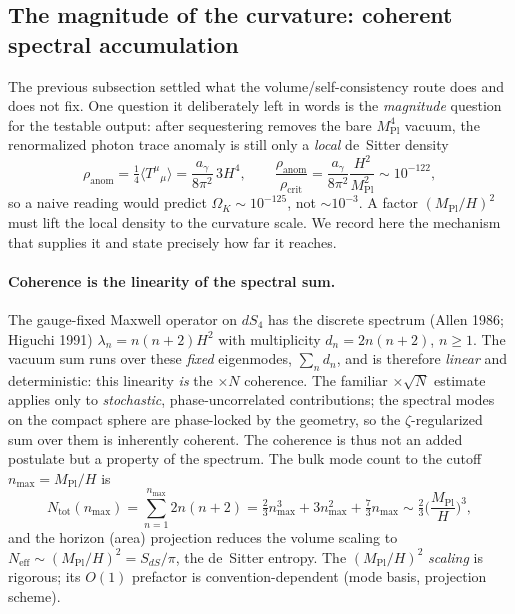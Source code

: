 \documentclass[11pt,a4paper]{article}
\theoremstyle{plain}
\theoremstyle{definition}
\theoremstyle{remark}
\newcommand{\Ok}{\Omega_K}
\newcommand{\ag}{a_\gamma}
\newcommand{\Mpl}{M_{\mathrm{Pl}}}
\newcommand{\avg}[1]{\langle #1 \rangle}
\begin{document}
\subsection{The magnitude of the curvature: coherent spectral accumulation}
\label{sec:coherence}
The previous subsection settled what the volume/self-consistency route does and does not fix.
One question it deliberately left in words is the \emph{magnitude} question for the testable
output: after sequestering removes the bare $\Mpl^4$ vacuum, the renormalized photon trace
anomaly is still only a \emph{local} de~Sitter density
\begin{equation}
\rho_{\mathrm{anom}} = \tfrac14\avg{T^\mu{}_\mu} = \frac{\ag}{8\pi^2}\,3H^4 ,
\qquad
\frac{\rho_{\mathrm{anom}}}{\rho_{\mathrm{crit}}} = \frac{\ag}{8\pi^2}\frac{H^2}{\Mpl^2}
\sim 10^{-122},
\label{eq:localanom}
\end{equation}
so a naive reading would predict $\Ok \sim 10^{-125}$, not $\sim 10^{-3}$. A factor $(\Mpl/H)^2$
must lift the local density to the curvature scale. We record here the mechanism that supplies
it and state precisely how far it reaches.

\paragraph{Coherence is the linearity of the spectral sum.} The gauge-fixed Maxwell operator on
$dS_4$ has the discrete spectrum (Allen 1986; Higuchi 1991) $\lambda_n = n(n+2)H^2$ with
multiplicity $d_n = 2n(n+2)$, $n\ge1$. The vacuum sum runs over these \emph{fixed} eigenmodes,
$\sum_n d_n$, and is therefore \emph{linear} and deterministic: this linearity \emph{is} the
$\times N$ coherence. The familiar $\times\sqrt N$ estimate applies only to \emph{stochastic},
phase-uncorrelated contributions; the spectral modes on the compact sphere are phase-locked by
the geometry, so the $\zeta$-regularized sum over them is inherently coherent. The coherence is
thus not an added postulate but a property of the spectrum. The bulk mode count to the cutoff
$n_{\max}=\Mpl/H$ is
\begin{equation}
N_{\mathrm{tot}}(n_{\max}) = \sum_{n=1}^{n_{\max}} 2n(n+2)
= \tfrac23 n_{\max}^3 + 3n_{\max}^2 + \tfrac73 n_{\max} \sim \tfrac23\Big(\frac{\Mpl}{H}\Big)^3 ,
\end{equation}
and the horizon (area) projection reduces the volume scaling to
$N_{\mathrm{eff}} \sim (\Mpl/H)^2 = S_{dS}/\pi$, the de~Sitter entropy. The $(\Mpl/H)^2$
\emph{scaling} is rigorous; its $O(1)$ prefactor is convention-dependent (mode basis, projection
scheme).
\end{document}
